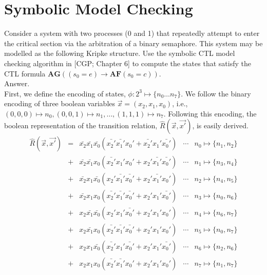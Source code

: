 \documentclass[a4paper,11pt]{article}
\theoremstyle{mytheor}
\begin{document}
\section{Symbolic Model Checking}
Consider a system with two processes (0 and 1) that repeatedly attempt to 
enter the critical section via the arbitration of a binary semaphore. This 
system may be modelled as the following Kripke structure. Use the symbolic 
CTL model checking algorithm in [CGP; Chapter 6] to compute the states that 
satisfy the CTL formula $\textbf{AG}((s_0 = e) \rightarrow \textbf{AF}(s_0 = c))$.
\medskip \\
Answer.
\smallskip \\
First, we define the encoding of states, $\phi: 2^3 \mapsto \{n_0\dotsc n_7\}$. We follow the
binary encoding of three boolean variables $\vec{x}=(x_2,x_1,x_0)$, i.e.,
$(0,0,0)\mapsto n_0, (0,0,1)\mapsto n_1, \dots, (1,1,1)\mapsto n_7$.
Following this encoding, the boolean representation of the transition relation,
$\hat{R}(\vec{x}, \vec{x'})$, is easily derived.
\begin{equation*}
\begin{array}{lclcl}
   \hat{R}(\vec{x}, \vec{x'})
      &=& \bar{x_2}\bar{x_1}\bar{x_0}(\bar{x_2'}\bar{x_1'}x_0' + \bar{x_2'}x_1'\bar{x_0'}) & \cdots & n_0 \mapsto \{n_1,n_2\}\\
      &+& \bar{x_2}\bar{x_1}x_0(\bar{x_2'}x_1'x_0' + x_2'\bar{x_1'}\bar{x_0'})             & \cdots & n_1 \mapsto \{n_3,n_4\}\\
      &+& \bar{x_2}x_1\bar{x_0}(x_2'\bar{x_1'}\bar{x_0'} + x_2'\bar{x_1'}x_0')             & \cdots & n_2 \mapsto \{n_4,n_5\}\\
      &+& \bar{x_2}x_1x_0(\bar{x_2'}\bar{x_1'}\bar{x_0'} + x_2'x_1'\bar{x_0'})             & \cdots & n_3 \mapsto \{n_0,n_6\}\\
      &+& x_2\bar{x_1}\bar{x_0}(x_2'x_1'\bar{x_0'} + x_2'x_1'x_0')                         & \cdots & n_4 \mapsto \{n_6,n_7\}\\
      &+& x_2\bar{x_1}x_0(\bar{x_2'}\bar{x_1'}\bar{x_0'} + x_2'x_1'x_0')                   & \cdots & n_5 \mapsto \{n_0,n_7\}\\
      &+& x_2x_1\bar{x_0}(\bar{x_2'}x_1'\bar{x_0'} + x_2'x_1'\bar{x_0'})                   & \cdots & n_6 \mapsto \{n_2,n_6\}\\
      &+& x_2x_1x_0(\bar{x_2'}\bar{x_1'}x_0' + x_2'x_1'x_0')                               & \cdots & n_7 \mapsto \{n_1,n_7\}\\
\end{array}
\end{equation*}
\end{document}
